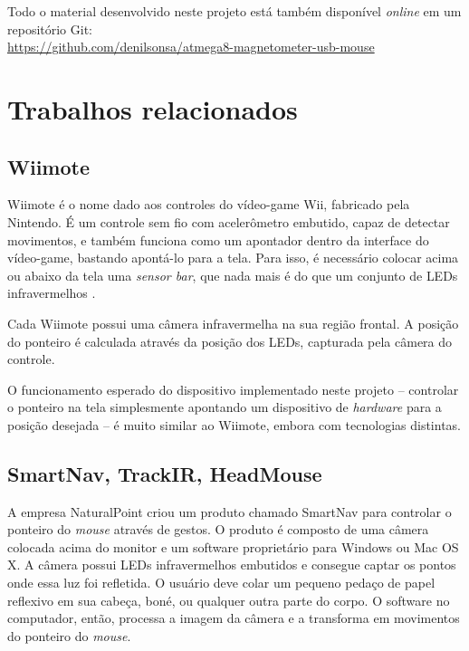 \documentclass[brazil,pagestart=firstchapter]{abnt}
\begin{document}
Todo o material desenvolvido neste projeto está também disponível
\textit{online} em um repositório Git: \\
\url{https://github.com/denilsonsa/atmega8-magnetometer-usb-mouse}


\section{Trabalhos relacionados}
\label{sec:trabalhos_relacionados}


\subsection{Wiimote}
\label{sub:wiimote}

Wiimote é o nome dado aos controles do vídeo-game Wii, fabricado pela
Nintendo. É um controle sem fio com acelerômetro embutido, capaz de detectar
movimentos, e também funciona como um apontador dentro da interface do
vídeo-game, bastando apontá-lo para a tela. Para isso, é necessário colocar
acima ou abaixo da tela uma \textit{sensor bar}, que nada mais é do que um
conjunto de \acsp{LED} infravermelhos \cite{WikipediaWiimote}.

Cada Wiimote possui uma câmera infravermelha na sua região frontal. A
posição do ponteiro é calculada através da posição dos \acsp{LED}, capturada
pela câmera do controle.

O funcionamento esperado do dispositivo implementado neste projeto --
controlar o ponteiro na tela simplesmente apontando um dispositivo de
\textit{hardware} para a posição desejada -- é muito similar ao Wiimote,
embora com tecnologias distintas.


\subsection{SmartNav, TrackIR, HeadMouse}
\label{sub:naturalpoint}

A empresa NaturalPoint criou um produto chamado SmartNav \cite{SmartNav}
para controlar o ponteiro do \textit{mouse} através de gestos. O produto é
composto de uma câmera colocada acima do monitor e um software proprietário
para Windows ou Mac OS X. A câmera possui \acsp{LED} infravermelhos
embutidos e consegue captar os pontos onde essa luz foi refletida. O usuário
deve colar um pequeno pedaço de papel reflexivo em sua cabeça, boné, ou
qualquer outra parte do corpo. O software no computador, então, processa a
imagem da câmera e a transforma em movimentos do ponteiro do \textit{mouse}.
\end{document}
